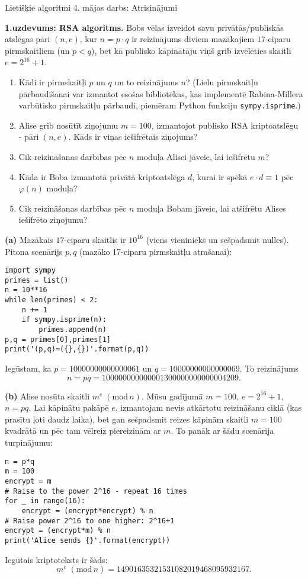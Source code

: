\documentclass[11pt]{article}
\newlength\myverbindent
\begin{document}
\thispagestyle{empty}

{\Large Lietišķie algoritmi \textendash{} 4. mājas darbs: Atrisinājumi}


{\footnotesize
\vspace{2ex}
{\bf 1.uzdevums: RSA algoritms.}
Bobs vēlas izveidot savu privātās/publiskās
atslēgas pāri $(n,e)$, kur $n = p \cdot q$ ir reizinājums diviem
mazākajiem $17$-ciparu pirmskaitļiem (un $p<q$), bet kā
publisko kāpinātāju viņš grib izvēlēties skaitli $e = 2^{16} + 1$.
\begin{enumerate}[label=(\alph*)]
\item Kādi ir pirmskaitļi $p$ un $q$ un to reizinājums $n$?
(Lielu pirmskaitļu pārbaudīšanai var izmantot esošas bibliotēkas, kas
implementē Rabina-Millera varbūtisko pirmskaitļu pārbaudi,
piemēram Python funkciju {\tt sympy.isprime}.)
\item Alise grib nosūtīt ziņojumu $m = 100$, izmantojot
publisko RSA kriptoatslēgu - pāri $(n,e)$. Kāds ir viņas
iešifrētais ziņojums?
\item Cik reizināšanas darbības pēc $n$ moduļa Alisei jāveic, lai
iešifrētu $m$?
\item Kāda ir Boba izmantotā privātā kriptoatslēga $d$, kurai
ir spēkā $e \cdot d \equiv 1$ pēc $\varphi(n)$ moduļa?
\item Cik reizināšanas darbības pēc $n$ moduļa Bobam jāveic, lai
atšifrētu Alises iešifrēto ziņojumu?
\end{enumerate}
}

\vspace{2ex}
{\bf (a)} Mazākais $17$-ciparu skaitlis ir $10^{16}$ (viens vieninieks
un sešpadsmit nulles). Pitona scenārijs $p,q$ (mazāko 17-ciparu pirmskaitļu atrašanai):
\setlength\myverbindent{.5in}
\begin{verbatim}
import sympy
primes = list()
n = 10**16
while len(primes) < 2:
    n += 1
    if sympy.isprime(n):
        primes.append(n)
p,q = primes[0],primes[1]
print('(p,q)=({},{})'.format(p,q))
\end{verbatim}
Iegūstam, ka $p=10000000000000061$ un $q=10000000000000069$. To reizinājums
$$n = pq = 100000000000001300000000000004209.$$


{\bf (b)} Alise nosūta skaitli $m^e\;(\text{mod}\,n)$. Mūsu gadījumā $m=100$,
$e = 2^{16} + 1$, $n = pq$. Lai kāpinātu pakāpē $e$, izmantojam nevis atkārtotu reizināšanu
ciklā (kas prasītu ļoti daudz laika), bet gan sešpadsmit reizes kāpinām skaitli $m=100$
kvadrātā un pēc tam vēlreiz piereizinām ar $m$. To panāk ar šādu scenārija turpinājumu:
\begin{verbatim}
n = p*q
m = 100
encrypt = m
# Raise to the power 2^16 - repeat 16 times
for _ in range(16):
    encrypt = (encrypt*encrypt) % n
# Raise power 2^16 to one higher: 2^16+1
encrypt = (encrypt*m) % n
print('Alice sends {}'.format(encrypt))
\end{verbatim}
Iegūtais kriptoteksts ir šāds:
$$m^e\;(\text{mod}\,n) = 14901635321531082019468095932167.$$
\end{document}
